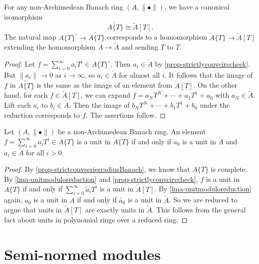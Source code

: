 \begin{corollary}\label{cor-reductionstrictlyconv}
    For any non-Archimedean Banach ring $(A,\|\bullet\|)$, we have a canonical isomorphism
    \[
        \widetilde{A\{T\}}\cong \tilde{A}[T].
    \]
    The natural map ${A\{T\}}^{\circ}\rightarrow \widetilde{A\{T\}}$ corresponds to a homomorphism $\mathring{A}\{T\}\rightarrow \tilde{A}[T]$ extending the homomorphism $\mathring{A}\rightarrow \tilde{A}$ and sending $T$ to $T$.
\end{corollary}
\begin{proof}
    Let $f=\sum_{i=0}^{\infty}a_i T^i\in {A\{T\}}^{\circ}$. 
    Then $a_i\in \mathring{A}$ by \cref{prop-strictlyconvcirccheck}. But $\|a_i\|\to 0$ as $i\to\infty$, so $a_i\in \check{A}$ for almost all $i$. It follows that the image of $f$ in $\widetilde{A\{T\}}$ is the same as the image of an element from $\mathring{A}[T]$. On the other hand, for each $f\in \tilde{A}[T]$, we can expand $f=a_NT^N+\cdots+a_1T^1+a_0$ with $a_N\in \tilde{A}$. Lift each $a_i$ to $b_i\in \mathring{A}$. Then the image of $b_NT^N+\cdots+b_1T^1+b_0$ under the reduction corresponds to $f$. The assertions follow.
\end{proof}

\begin{corollary}\label{cor-unitsstrictlyconv}
    Let $(A,\|\bullet\|)$ be a non-Archimedean Banach ring. An element $f=\sum_{i=0}^{\infty}a_i T^i\in \mathring{A}\{T\}$ is a unit in $\mathring{A}\{T\}$ if and only if $a_0$ is a unit in  $\mathring{A}$ and $a_i\in \check{A}$ for all $i>0$.
\end{corollary}
\begin{proof}
By \cref{prop-strictconvseriesradiusBanach}, we know that $A\{T\}$ is complete.
By \cref{lma-unitmoduloreduction} and \cref{prop-strictlyconvcirccheck}, $f$ is a unit in $\mathring{A}\{T\}$ if and only if $\sum_{i=0}^{\infty} \tilde{a}_i T^i$  is a unit in $\tilde{A}[T]$. By \cref{lma-unitmoduloreduction} again, $a_0$ is a unit in $A$ if and only if $\tilde{a_0}$ is a unit in $\tilde{A}$. So we are reduced to argue that units in $\tilde{A}[T]$ are exactly units in $\tilde{A}$. This follows from the general fact about units in polynomial rings over a reduced ring.
\end{proof}




\section{Semi-normed modules}

